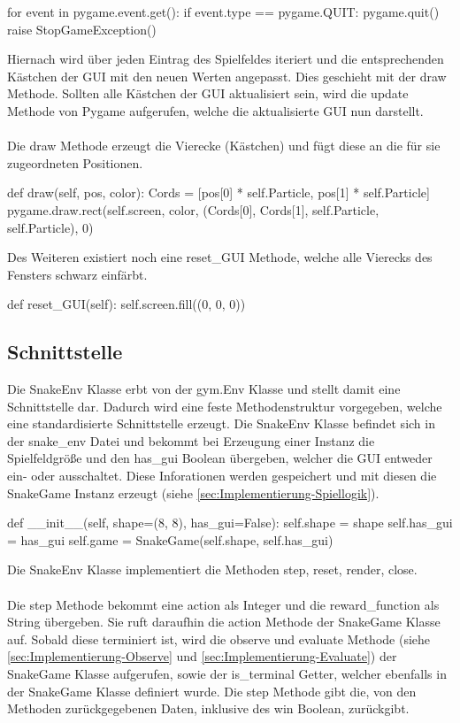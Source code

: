 \begin{python}
	for event in pygame.event.get():
		if event.type == pygame.QUIT:
			pygame.quit()
			raise StopGameException()
\end{python}
Hiernach wird über jeden Eintrag des Spielfeldes iteriert und die entsprechenden Kästchen der GUI mit den neuen Werten angepasst. Dies geschieht mit der draw Methode. Sollten alle Kästchen der GUI aktualisiert sein, wird die update Methode von Pygame aufgerufen, welche die aktualisierte GUI nun darstellt.\\
\\Die draw Methode erzeugt die Vierecke (Kästchen) und fügt diese an die für sie zugeordneten Positionen.
\begin{python}
	def draw(self, pos, color):
		Cords = [pos[0] * self.Particle, pos[1] * self.Particle]
		pygame.draw.rect(self.screen, color, (Cords[0], Cords[1],
									   self.Particle, self.Particle), 0)
\end{python}
Des Weiteren existiert noch eine reset\_GUI Methode, welche alle Vierecks des Fensters schwarz einfärbt.
\begin{python}
	def reset_GUI(self):
		self.screen.fill((0, 0, 0))
\end{python}

\subsection{Schnittstelle}
Die SnakeEnv Klasse erbt von der gym.Env Klasse und stellt damit eine Schnittstelle dar. Dadurch wird eine feste Methodenstruktur vorgegeben, welche eine standardisierte Schnittstelle erzeugt. Die SnakeEnv Klasse befindet sich in der snake\_env Datei und bekommt bei Erzeugung einer Instanz die Spielfeldgröße und den has\_gui Boolean übergeben, welcher die GUI entweder ein- oder ausschaltet. Diese Inforationen werden gespeichert und mit diesen die SnakeGame Instanz erzeugt (siehe \ref{sec:Implementierung-Spiellogik}).
\begin{python}
	def __init__(self, shape=(8, 8), has_gui=False):
		self.shape = shape
		self.has_gui = has_gui
		self.game = SnakeGame(self.shape, self.has_gui)
\end{python}
Die SnakeEnv Klasse implementiert die Methoden step, reset, render, close.\\
\\Die step Methode bekommt eine action als Integer und die reward\_function als String übergeben. Sie ruft daraufhin die action Methode der SnakeGame Klasse auf. Sobald diese terminiert ist, wird die observe und evaluate Methode (siehe \ref{sec:Implementierung-Observe} und \ref{sec:Implementierung-Evaluate}) der SnakeGame Klasse aufgerufen, sowie der is\_terminal Getter, welcher ebenfalls in der SnakeGame Klasse definiert wurde. Die step Methode gibt die, von den Methoden zurückgegebenen Daten, inklusive des win Boolean, zurückgibt.

